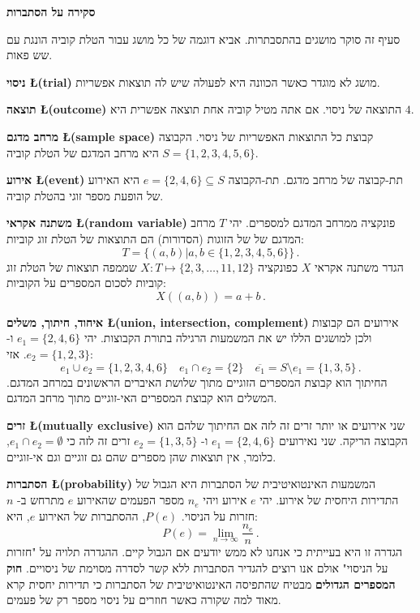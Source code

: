 

\newpage

\begin{center}
\textbf{\Large סקירה על הסתברות}
\end{center}

סעיף זה סוקר מושגים בהתסבתרות. אביא דוגמה של כל מושג עבור הטלת קוביה הונגת עם שש פאות. 

\textbf{ניסוי \L{\small (trial)}}
מושג לא מוגדר כאשר הכוונה היא לפעולה שיש לה תוצאות אפשריות.

\textbf{תוצאה \L{\small (outcome)}} 
התוצאה של ניסוי. אם אתה מטיל קוביה אחת תוצאה אפשרית היא 
$4$.

\textbf{מרחב מדגם \L{\small (sample space)}}
קבוצת כל התוצאות האפשריות של ניסוי. הקבוצה 
$S=\{1,2,3,4,5,6\}$
היא מרחב המדגם של הטלת קוביה.

\textbf{אירוע \L{\small (event)}}
תת-קבוצה של מרחב מדגם. תת-הקבוצה 
$e=\{2,4,6\}\subseteq S$
היא האירוע של הופעת מספר זוגי בהטלת קוביה.

\textbf{משתנה אקראי \L{\small (random variable)}}
פונקציה ממרחב המדגם למספרים. יהי 
$T$
מרחב המדגם של של הזוגות (הסדורות) הם התוצאות של הטלת זוג קוביות:
\[
T=\{(a,b)| a,b\in \{1,2,3,4,5,6\} \}\,.
\]
הגדר משתנה אקראי 
$X$
כפונקציה
$X:T \mapsto \{2,3,\ldots,11,12\}$
שממפה תוצאות של הטלת זוג קוביות לסכום המספרים על הקוביות:
\begin{equation}\label{eq.sum}
X((a,b)) = a+b\,.
\end{equation}

\textbf{איחוד, חיתוך, משלים \L{\small (union, intersection, complement)}} 
אירועים הם קבוצות ולכן למושגים הללו יש את המשמעות הרגילה בתורת הקבוצות. יהי
$e_1=\{2,4,6\}$
ו-%
$e_2=\{1,2,3\}$. 
אזי:
\[
e_1 \cup e_2=\{1,2,3,4,6\}\quad e_1 \cap e_2=\{2\}\quad \overline{e_1} = S\setminus e_1=\{1,3,5\}\,.
\]
החיתוך הוא קבוצת המספרים הזוגיים מתוך שלושת האיברים הראשונים במרחב המדגם. המשלים הוא קבוצת המספרים האי-זוגיים מתוך מרחב המדגם.

\textbf{זרים \L{\small (mutually exclusive)}} 
שני אירועים או יותר זרים זה לזה אם החיתוך שלהם הוא הקבוצה הריקה. שני נאירועים
$e_1=\{2,4,6\}$
ו-%
$e_2=\{1,3,5\}$
זרים זה לזה כי
$e_1 \cap e_2=\emptyset$,
כלומר, אין תוצאות שהן מספרים שהם גם זוגיים וגם אי-זוגיים.

\textbf{הסתברות \L{\small (probability)}}
המשמעות האינטואיטיבית של הסתברות היא הגבול של התדירות היחסית של אירוע. יהי
$e$ 
אירוע ויהי
$n_e$
מספר הפעמים שהאירוע 
$e$
מתרחש ב-%
$n$
חזרות על הניסוי. 
$P(e)$,
ההסתברות של האירוע
$e$,
היא:
\[
P(e) = \lim_{n\rightarrow \infty} \frac{n_e}{n}\,.
\]
הגדרה זו היא בעייתית כי אנחנו לא ממש יודעים אם הגבול קיים. ההגדרה תלויה על "חזרות על הניסוי" אולם אנו רוצים להגדיר הסתברות ללא קשר לסדרה מסוימת של ניסויים. 
\textbf{חוק המספרים הגדולים}
מבטיח שהתפיסה האינטואיטיבית של הסתברות כי תדירות יחסית קרא מאוד למה שקורה כאשר חוזרים על ניסוי מספר רק של פעמים.

